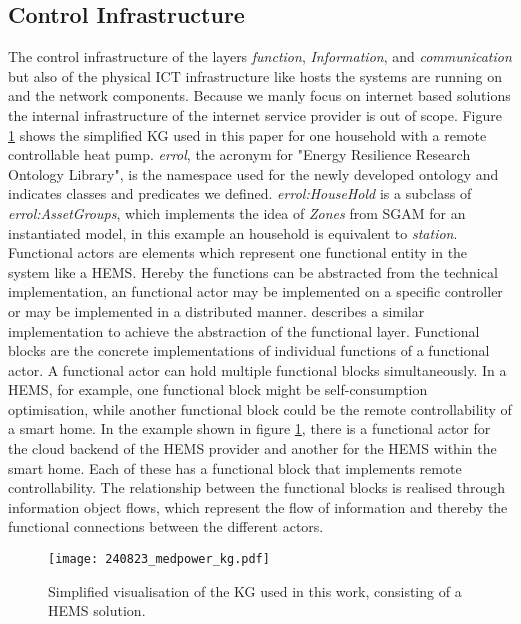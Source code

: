 \subsection{Control Infrastructure}
\label{subsec:control}

The control infrastructure of the layers \textit{function}, \textit{Information}, and \textit{communication} but also of the physical \ac{ICT} infrastructure like hosts the systems are running on and the network components.
Because we manly focus on internet based solutions the internal infrastructure of the internet service provider is out of scope.
Figure \ref{fig:kg} shows the simplified \ac{KG} used in this paper for one household with a remote controllable heat pump.
\textit{errol}, the acronym for "Energy Resilience Research Ontology Library", is the namespace used for the newly developed ontology and indicates classes and predicates we defined.
\textit{errol:HouseHold} is a subclass of \textit{errol:AssetGroups}, which implements the idea of \textit{Zones} from \ac{SGAM} for an instantiated model, in this example an household is equivalent to \textit{station}.
Functional actors are elements which represent one functional entity in the system like a \ac{HEMS}.
Hereby the functions can be abstracted from the technical implementation, an functional actor may be implemented on a specific controller or may be implemented in a distributed manner.
\cite{neureiter_domain-specific_2017} describes a similar implementation to achieve the abstraction of the functional layer.
Functional blocks are the concrete implementations of individual functions of a functional actor.
A functional actor can hold multiple functional blocks simultaneously.
In a \ac{HEMS}, for example, one functional block might be self-consumption optimisation, while another functional block could be the remote controllability of a smart home.
In the example shown in figure \ref{fig:kg}, there is a functional actor for the cloud backend of the HEMS provider and another for the HEMS within the smart home. Each of these has a functional block that implements remote controllability.
The relationship between the functional blocks is realised through information object flows, which represent the flow of information and thereby the functional connections between the different actors.
\vspace*{-0.4cm}
\begin{figure}[H]
	\centering
	\texttt{[image: 240823\_medpower\_kg.pdf]}
	\caption{
		Simplified visualisation of the \ac{KG} used in this work, consisting of a \ac{HEMS} solution.
	}
	\label{fig:kg}
\end{figure}
